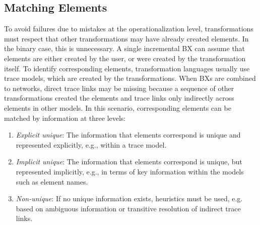 \subsection{Matching Elements}
\label{chap:prevention:interoperability:matching}

To avoid failures due to mistakes at the operationalization level, transformations must respect that other transformations may have already created elements.
In the binary case, this is unnecessary.
A single incremental \ac{BX} can assume that elements are either created by the user, %
or were created by the transformation itself.
To identify corresponding elements, transformation languages usually use trace models, which are created by the transformations.
When \acp{BX} are combined to networks, %
direct trace links may be missing because a sequence of other transformations created the elements and trace links only indirectly across elements in other models.
In this scenario, corresponding elements can be matched by information at three levels:
\begin{enumerate}
    \item \emph{Explicit unique}: The information that elements correspond is unique and represented explicitly, e.g., within a trace model. %
    \item \emph{Implicit unique}: The information that elements correspond is unique, but represented implicitly, e.g., in terms of key information within the models such as element names. %
    \item \emph{Non-unique}: If no unique information exists, heuristics must be used, e.g. based on ambiguous information or transitive resolution of indirect trace links.
\end{enumerate}

